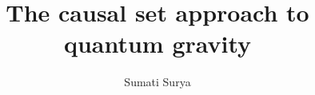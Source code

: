 \newcommand{\msM}{\mathcal{M}}
\newcommand{\msN}{\mathcal{N}}
\newcommand{\msP}{\mathcal{P}}
\newcommand{\msA}{\mathcal{A}}
\newcommand{\msF}{\mathcal{F}}
\newcommand{\cE}{\mathcal E}
\newcommand{\dm}{d}
\newcommand{\bbN}{\mathbb N}
\newcommand{\contg}{\mathcal H}
\newcommand{\bn}{\mathbf n} 
\newcommand{\bN}{\mathbf N} 
\newcommand{\ca}{\mathcal A} 
\newcommand{\rc}{\rho_c} 
\newcommand{\rp}{\rho_p} 

\newcommand{\rk}{\rho_\kappa} 
\newcommand{\cC}{\mathcal C}
\newcommand{\cM}{\mathcal M}
\newcommand{\bO}{\mathbf O}
\newcommand{\bbn}{\mathbf n} 
\newcommand{\br}{\mathbf r} 
\newcommand{\bR}{\mathbf R} 
\newcommand{\cAlex}{\mathbf I} 
\newcommand{\dns}{d_s}
\newcommand{\nth}{\mathrm{th}}
\newcommand{\lc}{\ell_c}
\newcommand{\llk}{\ell_\kappa}
\newcommand{\lp}{\ell_p}
\newcommand{\postcau}{\mathcal P}
\newcommand{\csgtree}{\mathcal T}
\newcommand{\tree}{\tilde \postcau}
\newcommand{\Og}{\Omega_g}
\newcommand{\tOg}{\tilde {\Og} }
\newcommand{\tD}{\tilde D} 
\newcommand{\tc}{\tilde c}
\newcommand{\fA}{\mathfrak A} 
\newcommand{\tfA}{\tilde \fA}
\newcommand{\tmu}{\tilde \mu}
\newcommand{\fS}{\mathfrak S} 
\newcommand{\tfS}{\tilde \fS}
\newcommand{\hmu}{\hat \mu}
\newcommand{\dlor}{\mathcal G_{Lor}}
\newcommand{\dca}{\mathcal G_{A}}
\newcommand{\fca}{f_a}
\newcommand{\fcb}{f_b} 
\newcommand{\complex}{\mathbb C}
\newcommand{\tth}{\mathrm th}
\newcommand{\cB}{\mathcal B}
\newcommand{\vs}{\mathcal{V}}

\def\nn{\nonumber}
%
%



\title{The causal set approach to quantum gravity}  
 

\author{Sumati Surya}

